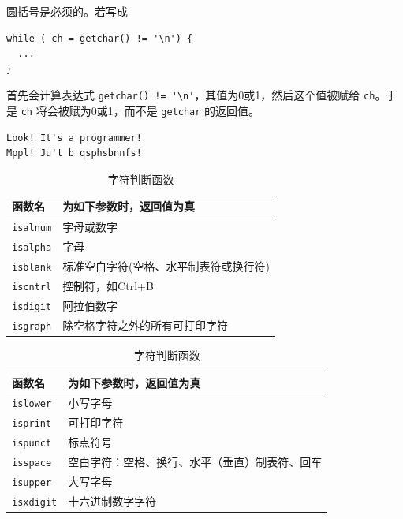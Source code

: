 \begin{frame}[fragile]
 圆括号是必须的。若写成
\begin{lstlisting}
while ( ch = getchar() != '\n') {
  ...   
}
\end{lstlisting}
首先会计算表达式 \lstinline|getchar() != '\n'|，其值为0或1，然后这个值被赋给 \lstinline|ch|。于是 \lstinline|ch| 将会被赋为0或1，而不是 \lstinline|getchar| 的返回值。
\end{frame}

\begin{frame}[fragile]

\end{frame}

\begin{frame}[fragile]
\begin{lstlisting}[backgroundcolor=\color{red!10}]
Look! It's a programmer!
Mppl! Ju't b qsphsbnnfs!
\end{lstlisting}
\end{frame}

\begin{frame}[fragile]
\begin{table}
\centering
\caption{字符判断函数}
\begin{tabular}{p{2cm}|p{8cm}}\hline
函数名&为如下参数时，返回值为真\\\hline\hline
\lstinline|isalnum| & 字母或数字\\[0.1in] 
\lstinline|isalpha| & 字母 \\[0.1in] 
\lstinline|isblank| & 标准空白字符(空格、水平制表符或换行符) \\[0.1in] 
\lstinline|iscntrl| & 控制符，如Ctrl+B \\[0.1in] 
\lstinline|isdigit| & 阿拉伯数字 \\[0.1in]
\lstinline|isgraph| & 除空格字符之外的所有可打印字符 \\\hline
\end{tabular}
\end{table}
\end{frame}

\begin{frame}[fragile]
\begin{table}
\centering
\caption{字符判断函数}
\begin{tabular}{p{2cm}|p{8cm}}\hline
函数名&为如下参数时，返回值为真\\\hline\hline
\lstinline|islower| & 小写字母\\[0.1in]
\lstinline|isprint| & 可打印字符 \\[0.1in]
\lstinline|ispunct| & 标点符号 \\[0.1in] 
\lstinline|isspace| & 空白字符：空格、换行、水平（垂直）制表符、回车 \\[0.1in] 
\lstinline|isupper| & 大写字母 \\[0.1in] 
\lstinline|isxdigit| & 十六进制数字字符 \\\hline
\end{tabular}
\end{table}
\end{frame}

